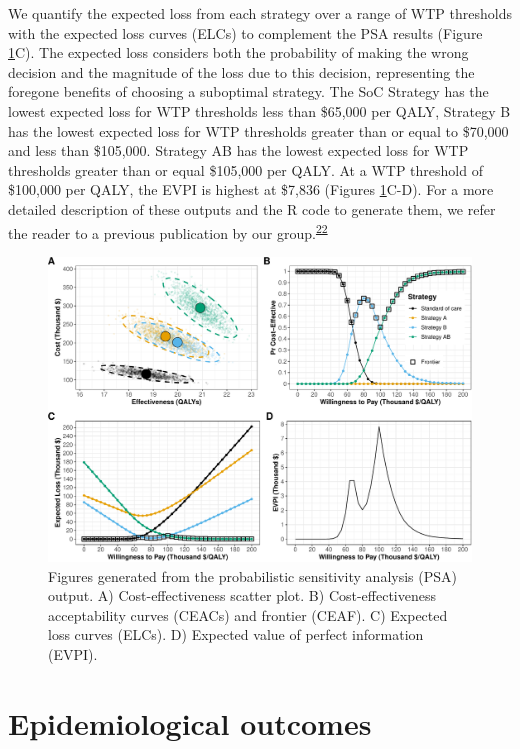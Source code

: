 \documentclass[
]{article}
\begin{document}
We quantify the expected loss from each strategy over a range of WTP thresholds with the expected loss curves (ELCs) to complement the PSA results (Figure \ref{fig:PSA-figures}C). The expected loss considers both the probability of making the wrong decision and the magnitude of the loss due to this decision, representing the foregone benefits of choosing a suboptimal strategy. The SoC Strategy has the lowest expected loss for WTP thresholds less than \$65,000 per QALY, Strategy B has the lowest expected loss for WTP thresholds greater than or equal to \$70,000 and less than \$105,000. Strategy AB has the lowest expected loss for WTP thresholds greater than or equal \$105,000 per QALY. At a WTP threshold of \$100,000 per QALY, the EVPI is highest at \$7,836 (Figures \ref{fig:PSA-figures}C-D). For a more detailed description of these outputs and the R code to generate them, we refer the reader to a previous publication by our group.\textsuperscript{\protect\hyperlink{ref-Alarid-Escudero2019}{22}}

\begin{figure}[H]

{\centering \includegraphics{figs/PSA-figures-1} 

}

\caption{Figures generated from the probabilistic sensitivity analysis (PSA) output. A) Cost-effectiveness scatter plot. B) Cost-effectiveness acceptability curves (CEACs) and frontier (CEAF). C) Expected loss curves (ELCs). D) Expected value of perfect information (EVPI).}\label{fig:PSA-figures}
\end{figure}

\hypertarget{epidemiological-outcomes}{%
\section{Epidemiological outcomes}\label{epidemiological-outcomes}}
\end{document}
